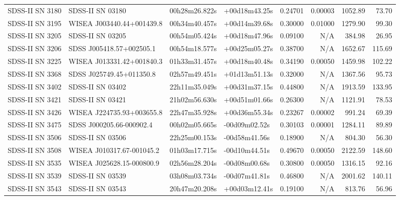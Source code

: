 \begin{longtable}{llllrrrr}
SDSS-II SN 3180  &                SDSS-II SN 03180 &   00h28m26.822s &   +00d18m43.25s &  0.24701 &  0.00003 &  1052.89 &       73.70 \\
SDSS-II SN 3195  &       WISEA J003440.44+001439.8 &   00h34m40.457s &   +00d14m39.68s &  0.30000 &  0.01000 &  1279.90 &       99.30 \\
SDSS-II SN 3205  &                SDSS-II SN 03205 &   00h54m05.424s &   +00d18m47.96s &  0.09100 &      N/A &   384.98 &       26.95 \\
SDSS-II SN 3206  &        SDSS J005418.57+002505.1 &   00h54m18.577s &   +00d25m05.27s &  0.38700 &      N/A &  1652.67 &      115.69 \\
SDSS-II SN 3225  &       WISEA J013331.42+001840.3 &   01h33m31.457s &   +00d18m40.48s &  0.34190 &  0.00050 &  1459.98 &      102.22 \\
SDSS-II SN 3368  &        SDSS J025749.45+011350.8 &   02h57m49.451s &   +01d13m51.13s &  0.32000 &      N/A &  1367.56 &       95.73 \\
SDSS-II SN 3402  &                SDSS-II SN 03402 &   22h11m35.049s &   +00d31m37.15s &  0.44800 &      N/A &  1913.59 &      133.95 \\
SDSS-II SN 3421  &                SDSS-II SN 03421 &   21h02m56.630s &   +00d51m01.66s &  0.26300 &      N/A &  1121.91 &       78.53 \\
SDSS-II SN 3426  &       WISEA J224735.93+003655.8 &   22h47m35.928s &   +00d36m55.34s &  0.23267 &  0.00002 &   991.24 &       69.39 \\
SDSS-II SN 3475  &        SDSS J000205.66-000902.4 &   00h02m05.665s &   -00d09m02.52s &  0.30103 &  0.00001 &  1284.11 &       89.89 \\
SDSS-II SN 3506  &                SDSS-II SN 03506 &   22h25m00.153s &   -00d58m41.56s &  0.18900 &      N/A &   804.30 &       56.30 \\
SDSS-II SN 3508  &       WISEA J010317.67-001045.2 &   01h03m17.715s &   -00d10m44.51s &  0.49670 &  0.00050 &  2122.59 &      148.60 \\
SDSS-II SN 3535  &       WISEA J025628.15-000800.9 &   02h56m28.204s &   -00d08m00.68s &  0.30800 &  0.00050 &  1316.15 &       92.16 \\
SDSS-II SN 3539  &                SDSS-II SN 03539 &   03h08m03.734s &   -00d07m41.81s &  0.46800 &      N/A &  2001.62 &      140.11 \\
SDSS-II SN 3543  &                SDSS-II SN 03543 &   20h47m20.208s &   +00d03m12.41s &  0.19100 &      N/A &   813.76 &       56.96 \\

\end{longtable}
